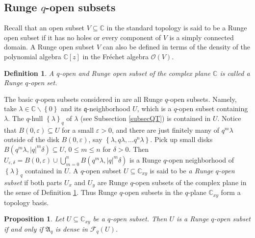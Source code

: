 \documentclass[12pt,reqno]{amsart}%
\theoremstyle{plain}
\newtheorem{definition}{Definition}
\newtheorem{proposition}{Proposition}
\numberwithin{theorem}{section} \numberwithin{equation}{section}
\numberwithin{lemma}{section}
\numberwithin{remark}{section}
\numberwithin{example}{section}
\numberwithin{proposition}{section}
\numberwithin{definition}{section}
\numberwithin{corollary}{section}
\begin{document}
\subsection{Runge $q$-open subsets}

Recall that an open subset $V\subseteq\mathbb{C}$ in the standard topology is
said to be a Runge open subset if it has no holes or every component of $V$ is
a simply connected domain. A Runge open subset $V$ can also be defined in
terms of the density of the polynomial algebra $\mathbb{C}\left[  z\right]  $
in the Fr\'{e}chet algebra $\mathcal{O}\left(  V\right)  $.

\begin{definition}
\label{def6}A $q$-open and Runge open subset of the complex plane $\mathbb{C}$
is called \textit{a Runge }$q$\textit{-open set}.
\end{definition}

The basic $q$-open subsets considered in \cite{Dosi24} are all Runge $q$-open
subsets. Namely, take $\lambda\in\mathbb{C}\backslash\left\{  0\right\}  $ and
its $\mathfrak{q}$-neighborhood $U$, which is a $q$-open subset containing
$\lambda$. The $q$-hull $\left\{  \lambda\right\}  _{q}$ of $\lambda$ (see
Subsection \ref{subsecQT}) is contained in $U$. Notice that $B\left(
0,\varepsilon\right)  \subseteq U$ for a small $\varepsilon>0$, and there are
just finitely many of $q^{m}\lambda$ outside of the disk $B\left(
0,\varepsilon\right)  $, say $\left\{  \lambda,q\lambda,\ldots q^{n}%
\lambda\right\}  $. Pick up small disks $B\left(  q^{m}\lambda,\left\vert
q\right\vert ^{m}\delta\right)  \subseteq U$, $0\leq m\leq n$ for $\delta>0$.
Then $U_{\varepsilon,\delta}=B\left(  0,\varepsilon\right)  \cup
\bigcup\limits_{m=0}^{n}B\left(  q^{m}\lambda,\left\vert q\right\vert
^{m}\delta\right)  $ is a Runge $q$-open neighborhood of $\left\{
\lambda\right\}  _{q}$ contained in $U$. A $q$-open subset $U\subseteq
\mathbb{C}_{xy}$ is said to be \textit{a Runge }$q$\textit{-open subset }if
both parts $U_{x}$ and $U_{y}$ are Runge $q$-open subsets of the complex plane
in the sense of Definition \ref{def6}. Thus Runge $q$-open subsets in the
$q$-plane $\mathbb{C}_{xy}$ form a topology basis.

\begin{proposition}
\label{propRunge}Let $U\subseteq\mathbb{C}_{xy}$ be a $q$-open subset. Then
$U$ is a Runge $q$-open subset if and only if $\mathfrak{A}_{q}$ is dense in
$\mathcal{F}_{q}\left(  U\right)  $.
\end{proposition}
\end{document}
